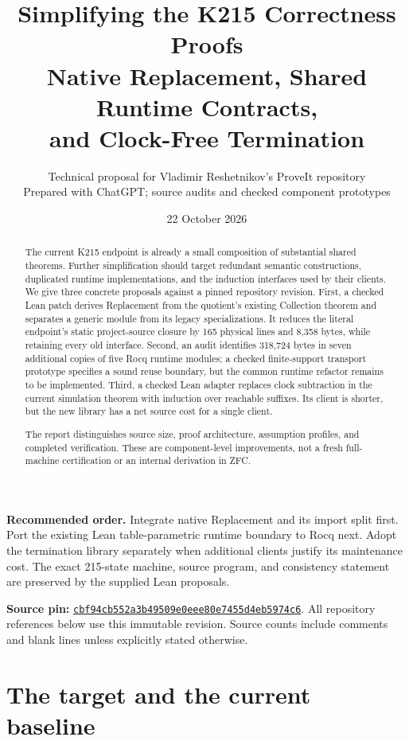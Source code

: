 \documentclass[11pt,a4paper]{article}
\title{\vspace{-1.2cm}\color{ink}\textbf{Simplifying the K215 Correctness Proofs}\\[0.45em]
\large Native Replacement, Shared Runtime Contracts,\\and Clock-Free Termination}
\author{Technical proposal for Vladimir Reshetnikov's ProveIt repository\\
\small Prepared with ChatGPT; source audits and checked component prototypes}
\date{22 October 2026}
\newcommand{\repo}{https://github.com/VladimirReshetnikov/ProveIt}
\newcommand{\pin}{cbf94cb552a3b49509e0eee80e7455d4eb5974c6}
\theoremstyle{remark}
\begin{document}
\maketitle
\begin{abstract}
The current K215 endpoint is already a small composition of substantial shared
theorems. Further simplification should target redundant semantic constructions,
duplicated runtime implementations, and the induction interfaces used by their
clients. We give three concrete proposals against a pinned repository revision.
First, a checked Lean patch derives Replacement from the quotient's existing
Collection theorem and separates a generic module from its legacy
specializations. It reduces the literal endpoint's static project-source closure
by 165 physical lines and 8,358 bytes, while retaining every old interface.
Second, an audit identifies 318,724 bytes in seven additional copies of five
Rocq runtime modules; a checked finite-support transport prototype specifies a
sound reuse boundary, but the common runtime refactor remains to be implemented.
Third, a checked Lean adapter replaces clock subtraction in the current
simulation theorem with induction over reachable suffixes. Its client is shorter,
but the new library has a net source cost for a single client.

The report distinguishes source size, proof architecture, assumption profiles,
and completed verification. These are component-level improvements, not a fresh
full-machine certification or an internal derivation in ZFC.
\end{abstract}
\begingroup\setlength{\fboxsep}{8pt}
\colorbox{pale}{\parbox{\dimexpr\linewidth-2\fboxsep\relax}{
\textbf{Recommended order.}
Integrate native Replacement and its import split first. Port the existing
Lean table-parametric runtime boundary to Rocq next. Adopt the termination
library separately when additional clients justify its maintenance cost.
The exact 215-state machine, source program, and consistency statement are
preserved by the supplied Lean proposals.}}
\endgroup
\vspace{0.6em}

\textbf{Source pin:} \href{\repo/commit/\pin}{\texttt{\pin}}.
All repository references below use this immutable revision. Source counts
include comments and blank lines unless explicitly stated otherwise.
\clearpage
\begingroup
\small
\setlength{\parskip}{0pt}
\tableofcontents
\endgroup
\clearpage

\section{The target and the current baseline}
\label{sec:baseline}
\end{document}
